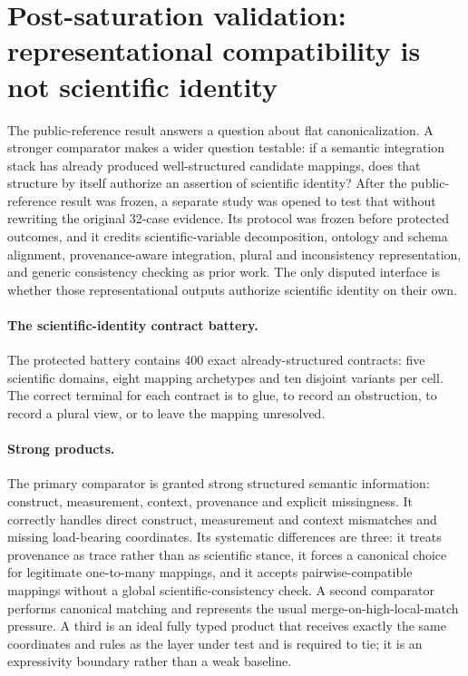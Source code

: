 \section{Post-saturation validation: representational compatibility is not scientific identity}
\label{sec:successor}

The public-reference result answers a question about flat canonicalization.
A stronger comparator makes a wider question testable: if a semantic
integration stack has already produced well-structured candidate mappings,
does that structure by itself authorize an assertion of scientific identity?
After the public-reference result was frozen, a separate study was opened to
test that without rewriting the original 32-case evidence. Its protocol was
frozen before protected outcomes, and it credits scientific-variable
decomposition, ontology and schema alignment, provenance-aware integration,
plural and inconsistency representation, and generic consistency checking as
prior work. The only disputed interface is whether those representational
outputs authorize scientific identity on their own.

\paragraph{The scientific-identity contract battery.}
The protected battery contains 400 exact already-structured contracts: five
scientific domains, eight mapping archetypes and ten disjoint variants per
cell. The correct terminal for each contract is to glue, to record an
obstruction, to record a plural view, or to leave the mapping unresolved.

\paragraph{Strong products.}
The primary comparator is granted strong structured semantic information:
construct, measurement, context, provenance and explicit missingness. It
correctly handles direct construct, measurement and context mismatches and
missing load-bearing coordinates. Its systematic differences are three: it
treats provenance as trace rather than as scientific stance, it forces a
canonical choice for legitimate one-to-many mappings, and it accepts
pairwise-compatible mappings without a global scientific-consistency check. A
second comparator performs canonical matching and represents the usual
merge-on-high-local-match pressure. A third is an ideal fully typed product
that receives exactly the same coordinates and rules as the layer under test
and is required to tie; it is an expressivity boundary rather than a weak
baseline.

